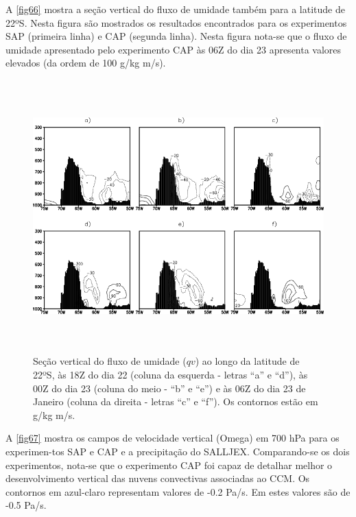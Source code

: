 A \autoref{fig66} mostra a seção vertical do fluxo de umidade também para a latitude de 22ºS. Nesta figura são mostrados os resultados encontrados para os experimentos SAP (primeira linha) e CAP (segunda linha). Nesta figura nota-se que o fluxo de umidade apresentado pelo experimento CAP às 06Z do dia 23 apresenta valores elevados (da ordem de 100 g/kg m/s).

\begin{figure}
\centering
\includegraphics[height=10.5cm]{./figs/sec_vert_flux_umi.png}
\caption{Seção vertical do fluxo de umidade ($qv$) ao longo da latitude de 22ºS, às 18Z do dia 22 (coluna da esquerda - letras ``a'' e ``d''), às 00Z do dia 23 (coluna do meio - ``b'' e ``e'') e às 06Z do dia 23 de Janeiro (coluna da direita - letras ``c'' e ``f''). Os contornos estão em g/kg m/s.}
\label{fig66}
\end{figure}

A \autoref{fig67} mostra os campos de velocidade vertical (Omega) em 700 hPa para os experimen-tos SAP e CAP e a precipitação do SALLJEX. Comparando-se os dois experimentos, nota-se que o experimento CAP foi capaz de detalhar melhor o desenvolvimento vertical das nuvens convectivas associadas ao CCM. Os contornos em azul-claro representam valores de -0.2 Pa/s. Em  estes valores são de -0.5 Pa/s.
 
